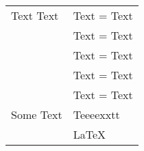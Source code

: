 \begin{table}[H]
\begin{tabular}{|l|p{5cm}|l|l|l|}
  \multicolumn{2}{|l|}{Text Text}    & \multicolumn{3}{l|}{Text = Text}                    \\
  \multicolumn{2}{|l|}{}             & \multicolumn{3}{l|}{Text = Text}                    \\
  \multicolumn{2}{|l|}{}             & \multicolumn{3}{l|}{Text = Text}                    \\
  \multicolumn{2}{|l|}{}             & \multicolumn{3}{l|}{Text = Text}                    \\
  \multicolumn{2}{|l|}{}             & \multicolumn{3}{l|}{Text = Text}                    \\
  \hline %
  \multicolumn{2}{|l|}{Some Text}    & \multicolumn{3}{l|}{Teeeexxtt}                      \\
  \multicolumn{2}{|l|}{}             & \multicolumn{3}{l|}{\LaTeX}                         \\
  \hline %
\end{tabular}
\end{table}

 

\pagebreak